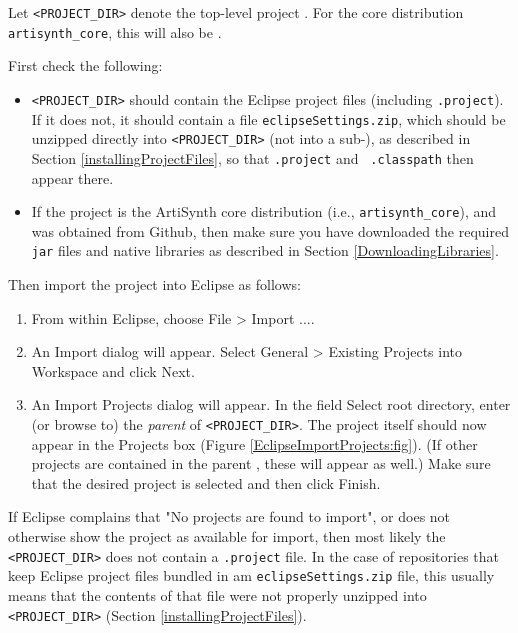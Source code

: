 Let {\tt <PROJECT\_DIR>} denote the top-level project \directory{}.
For the core distribution {\tt artisynth\_core}, this will also be
\ArtHome[].

First check the following:

\begin{itemize}

\item {\tt <PROJECT\_DIR>} should contain the
Eclipse project files (including {\tt .project}). If it does not, it
should contain a file {\tt eclipseSettings.zip}, which should be
unzipped directly into {\tt <PROJECT\_DIR>} (not into a
sub-\directory{}), as described in
Section \ref{installingProjectFiles}, so that {\tt .project} and {\tt
.classpath} then appear there.

\item If the project is the ArtiSynth core distribution (i.e., 
{\tt artisynth\_core}), and was obtained from Github, then make sure
you have downloaded the required {\tt jar} files and native libraries
as described in Section \ref{DownloadingLibraries}.

\end{itemize}

Then import the project into Eclipse as follows:

\begin{enumerate}

\item From within Eclipse, choose {\sf File > Import ...}.

\item An {\sf Import} dialog will appear. 
Select {\sf General > Existing Projects into Workspace} and click {\sf Next}.

\item An {\sf Import Projects} dialog will appear. 
In the field {\sf Select root directory}, enter (or browse to) the
{\it parent} \directory{} of {\tt <PROJECT\_DIR>}. The project
itself should now appear in the {\sf Projects} box (Figure
\ref{EclipseImportProjects:fig}). (If other projects are contained in the 
parent \directory{}, these will appear as well.)
Make sure that the
desired project is selected and then click {\sf Finish}.

\end{enumerate}

\begin{sideblock}
If Eclipse complains that {\sf "No projects are found to import"}, or
does not otherwise show the project as available for import,
then most likely the {\tt <PROJECT\_DIR>}
\directory{} does not contain a {\tt .project} file.
In the case of repositories that keep Eclipse project
files bundled in am {\tt eclipseSettings.zip} file, this usually
means that the contents of that file were not properly unzipped into
{\tt <PROJECT\_DIR>} (Section \ref{installingProjectFiles}).
\end{sideblock}

